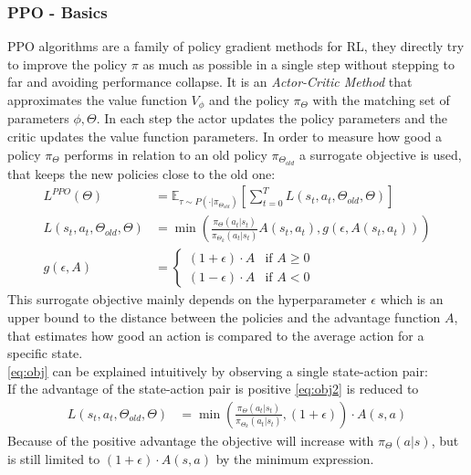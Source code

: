 \subsubsection{PPO - Basics} \label{sec:ppo}
PPO algorithms \cite{schulman2017proximal} are a family of policy gradient methods for RL, 
they directly try to improve the policy $\pi$ as much as possible in a single step without stepping to far and avoiding performance collapse. 
It is an \emph{Actor-Critic Method} that approximates the value function $V_{\phi}$ and the policy $\pi_{\Theta}$ with the matching set of parameters $\phi, \Theta$. 
In each step the actor updates the policy parameters and the critic updates the value function parameters. 
In order to measure how good a policy $\pi_{\Theta}$ performs in relation to an old policy $\pi_{\Theta_{old}}$ a surrogate objective is used, 
that keeps the new policies close to the old one:
\begin{align}
	L^{PPO} (\Theta) &= \mathbb{E}_{\tau \sim P(\cdot | \pi_{\Theta_{old}})}[\sum_{t=0}^{T} L(s_t, a_t, \Theta_{old}, \Theta)] \label{eq:obj} \\
	L(s_t, a_t, \Theta_{old}, \Theta) &= \min (
	\frac{\pi_{\Theta}(a_t|s_t)}{\pi_{\Theta_k}(a_t|s_t)} A(s_t, a_t), g(\epsilon, A(s_t, a_t))) \label{eq:obj2}\\
	g(\epsilon, A) &= 
	\left\{
	\begin{array}{ll}
		(1 + \epsilon) \cdot  A  & \mbox{if } A \geq 0\\
		(1 - \epsilon) \cdot A & \mbox{if } A < 0
	\end{array}
	\right. \label{eq:g}
\end{align}
\newline
This surrogate objective mainly depends on the hyperparameter $\epsilon$ which is an upper bound to the distance 
between the policies and the advantage function $A$, that estimates how good an action is compared to the average action for a specific state.\\
\cref{eq:obj} can be explained intuitively by observing a single state-action pair:\\
If the advantage of the state-action pair is positive \cref{eq:obj2} is reduced to
\begin{align}
	L(s_t, a_t, \Theta_{old}, \Theta) &= \min (\frac{\pi_{\Theta}(a_t|s_t)}{\pi_{\Theta_k}(a_t|s_t)}, (1 + \epsilon)) \cdot A(s,a)
\end{align}
Because of the positive advantage the objective will increase with $\pi_{\Theta} (a|s)$, 
but is still limited to $(1 + \epsilon) \cdot A(s,a)$ by the minimum expression. \\
